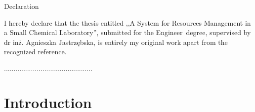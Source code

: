 \documentclass[a4paper,11pt,twoside]{report}
\theoremstyle{definition}
\renewcommand{\title}{A System for Resources Management in a Small Chemical Laboratory}
\newcommand{\type}{Engineer} %
\newcommand{\supervisor}{dr inż. Agnieszka Jastrzębska} %
\begin{document}
\par\vspace{5cm}

\begin{center}
Declaration
\end{center}

I hereby declare that the thesis entitled ,,\title '', submitted for the \type ~degree, supervised  by \supervisor , is entirely my original work apart from the recognized reference.
\vspace{2cm}

\begin{flushright}
  \begin{minipage}{50mm}
    \begin{center}
      ..............................................

    \end{center}
  \end{minipage}
\end{flushright}

\thispagestyle{empty}
\newpage

\null\thispagestyle{empty}\newpage
\tableofcontents
\thispagestyle{empty}
\newpage %



\null\thispagestyle{empty}\newpage
\pagestyle{fancy}
\setcounter{page}{11}


\chapter*{Introduction}
\end{document}
